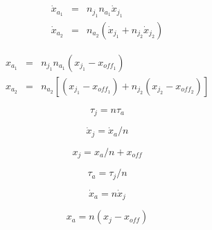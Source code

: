 \documentclass{article}
\begin{document}
\begin{eqnarray*}
\dot{x}_{a_1} & = & n_{j_1} n_{a_1} \dot{x}_{j_1} \\
\dot{x}_{a_2} & = & n_{a_2} (\dot{x}_{j_1} + n_{j_2} \dot{x}_{j_2})
\end{eqnarray*}
\pagebreak

\begin{eqnarray*}
x_{a_1} & = & n_{j_1} n_{a_1} (x_{j_1} - x_{off_1}) \\
x_{a_2} & = & n_{a_2} \left[(x_{j_1} - x_{off_1}) + n_{j_2} (x_{j_2}  - x_{off_2})\right]
\end{eqnarray*}
\pagebreak

\[ \tau_j = n \tau_a \]
\pagebreak

\[ \dot{x}_j = \dot{x}_a / n \]
\pagebreak

\[ x_j = x_a / n + x_{off} \]
\pagebreak

\[ \tau_a = \tau_j / n\]
\pagebreak

\[ \dot{x}_a = n \dot{x}_j \]
\pagebreak

\[ x_a = n (x_j - x_{off}) \]
\pagebreak
\end{document}
